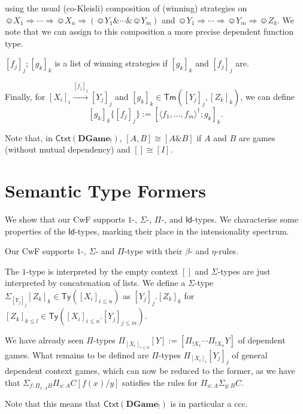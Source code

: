 \documentclass[runningheads,a4paper]{llncs}
\newcommand{\ra}[1]{\stackrel{#1}{\longrightarrow}}
\newcommand{\DGame}{\mathbf{DGame}}
\newcommand{\tot}[0]{\smiley}
\begin{document}
using the usual (co-Kleisli) composition of (winning) strategies on $\tot{ X_1}\Rightarrow \cdots\Rightarrow \tot{ X_n}\Rightarrow (\tot{ Y_1}\&\cdots\&\tot{ Y_m})$ and $\tot{ Y_1}\Rightarrow \cdots\Rightarrow \tot{ Y_m}\Rightarrow \tot{Z_k}$. We note that we can assign to this composition a more precise dependent function type.

\begin{claim}\label{lem:comp}
$[f_j]_j;[g_k]_k$ is a list of winning strategies if $[g_k]_k$ and $[f_j]_j$ are.
\end{claim}
Finally, for $[X_i]_i\ra{[f_j]_j}[Y_j]_j$ and $[g_k]_k\in\mathsf{Tm}([Y_j]_j,[Z_k]_k)$, we can define
$$[g_k]_k\{[f_j]_j\}:=[\langle f_1,\ldots,f_m\rangle^\dagger;g_k]_k.
$$
\begin{remark}Note that, in $\mathsf{Ctxt}(\DGame_!)$, $[A,B]\cong [A\& B]$ if $A$ and $B$ are games (without mutual dependency) and $[]\cong [I]$.
\end{remark}
\vspace{-12pt}
\section{Semantic Type Formers}
\vspace{-7pt}
We show that our CwF supports $1$-, $\Sigma$-, $\Pi$-, and $\mathsf{Id}$-types. We characterise some properties of the $\mathsf{Id}$-types, marking their place in the intensionality spectrum.

\begin{theorem}Our CwF supports $1$-, $\Sigma$- and $\Pi$-type with their $\beta$- and $\eta$-rules.
\end{theorem}
The $1$-type is interpreted by the empty context $[]$ and $\Sigma$-types are just interpreted by concatenation of lists. We define a $\Sigma$-type $\Sigma_{[Y_j]_j}[Z_k]_k\in\mathsf{Ty}([X_i]_{i\leq n})$ as $[Y_j]_j.[Z_k]_k$ for
 $[Z_k]_{k\leq l}\in\mathsf{Ty}([X_i]_{i\leq n}.[Y_j]_{j\leq m})$.

We have already seen $\Pi$-types $\Pi_{[X_i]_{i\leq n}}[Y]:=[\Pi_{!X_1}\cdots\Pi_{!X_n}Y]$ of dependent games. What remains to be defined are $\Pi$-types $\Pi_{[X_i]_i}[Y_j]_j$ of general dependent context games, which can now be reduced to the former, as we have that $\Sigma_{f:\Pi_{x:A}B}\Pi_{x:A}C[f(x)/y]$ satisfies the rules for $\Pi_{x:A}\Sigma_{y:B}C $.
\begin{corollary}Note that this means that $\mathsf{Ctxt}(\DGame_!)$ is in particular a ccc.\end{corollary}
\end{document}
